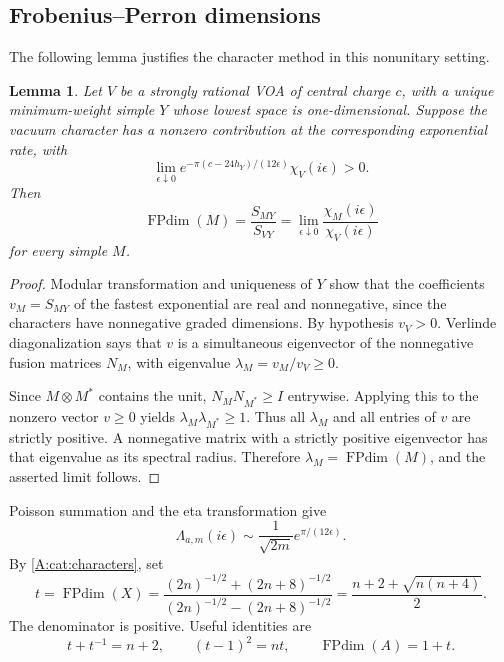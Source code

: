 \documentclass[11pt]{article}
\newtheorem{lemma}[theorem]{Lemma}
\newcommand{\FP}{\operatorname{FPdim}}\newcommand{\Irr}{\operatorname{Irr}}
\numberwithin{equation}{section}
\begin{document}
\subsection{Frobenius--Perron dimensions}
The following lemma justifies the character method in this nonunitary setting.
\begin{lemma}\label{A:cat:PFlemma}
Let $V$ be a strongly rational VOA of central charge $c$, with a unique minimum-weight simple $Y$ whose lowest space is one-dimensional. Suppose the vacuum character has a nonzero contribution at the corresponding exponential rate, with
\[
 \lim_{\epsilon\downarrow0}e^{-\pi(c-24h_Y)/(12\epsilon)}\chi_V(i\epsilon)>0.
\]
Then
\[
 \FP(M)=\frac{S_{MY}}{S_{VY}}
 =\lim_{\epsilon\downarrow0}\frac{\chi_M(i\epsilon)}{\chi_V(i\epsilon)}
\]
for every simple $M$.
\end{lemma}
\begin{proof}
Modular transformation and uniqueness of $Y$ show that the coefficients $v_M=S_{MY}$ of the fastest exponential are real and nonnegative, since the characters have nonnegative graded dimensions. By hypothesis $v_V>0$. Verlinde diagonalization says that $v$ is a simultaneous eigenvector of the nonnegative fusion matrices $N_M$, with eigenvalue $\lambda_M=v_M/v_V\geq0$.

Since $M\otimes M^*$ contains the unit, $N_MN_{M^*}\geq I$ entrywise. Applying this to the nonzero vector $v\geq0$ yields $\lambda_M\lambda_{M^*}\geq1$. Thus all $\lambda_M$ and all entries of $v$ are strictly positive. A nonnegative matrix with a strictly positive eigenvector has that eigenvalue as its spectral radius. Therefore $\lambda_M=\FP(M)$, and the asserted limit follows.
\end{proof}

Poisson summation and the eta transformation give
\[
 \Lambda_{a,m}(i\epsilon)\sim\frac{1}{\sqrt{2m}}
 e^{\pi/(12\epsilon)}.
\]
By \eqref{A:cat:characters}, set
\begin{equation}\label{A:cat:tdef}
 t=\FP(X)=\frac{(2n)^{-1/2}+(2n+8)^{-1/2}}
 {(2n)^{-1/2}-(2n+8)^{-1/2}}
 =\frac{n+2+\sqrt{n(n+4)}}2.
\end{equation}
The denominator is positive. Useful identities are
\begin{equation}\label{A:cat:tidentities}
 t+t^{-1}=n+2,\qquad (t-1)^2=nt,\qquad \FP(A)=1+t.
\end{equation}
\end{document}
